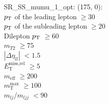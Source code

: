 SR\_SS\_mumu\_1\_opt: (175, 0): \\
$p_{\text{T}}$ of the leading lepton $\geq 30$ \\
$p_{\text{T}}$ of the subleading lepton $\geq 20$ \\
Dilepton $p_{\text{T}}$ $\geq 60$ \\
$m_{T2}$ $\geq 75$ \\
$|\Delta\eta_{ll}|$ $<1.5$ \\
$E_{\text{T}}^{\text{miss,rel}}$ $\geq 5$ \\
$m_{\text{eff}}$ $\geq 200$ \\
$m_{\text{T}}^{\text{max}}$ $\geq 100$ \\
$m_{lj}$/$m_{ljj}$ $<90$ \\
